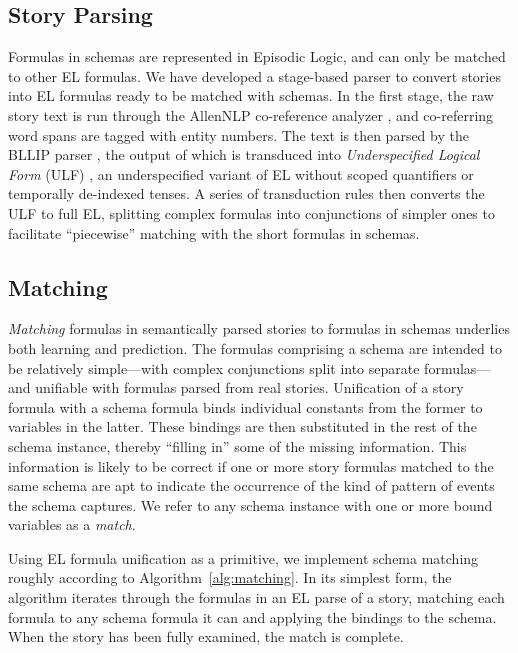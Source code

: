 \subsection{Story Parsing}
\label{sec:parsing}
Formulas in schemas are represented in Episodic Logic, and can only be matched to other EL formulas. We have developed a stage-based parser to convert stories into EL formulas ready to be matched with schemas. In the first stage, the raw story text is run through the AllenNLP co-reference analyzer \citep{Gardner2017AllenNLP}, and co-referring word spans are tagged with entity numbers. The text is then parsed by the BLLIP parser \citep{charniak2000maximum}, the output of which is transduced into \textit{Underspecified Logical Form} (ULF) \citep{kim2019IWCS}, an underspecified variant of EL without scoped quantifiers or temporally de-indexed tenses. A series of transduction rules then converts the ULF to full EL, splitting complex formulas into conjunctions of simpler ones to facilitate ``piecewise'' matching with the short formulas in schemas.

\subsection{Matching}

\textit{Matching} formulas in semantically parsed stories to formulas in schemas underlies both learning and prediction. The formulas comprising a schema are intended to be relatively simple---with complex conjunctions split into separate formulas---and unifiable with formulas parsed from real stories. Unification of a story formula with a schema formula binds individual constants from the former to variables in the latter. These bindings are then substituted in the rest of the schema instance, thereby ``filling in'' some of the missing information. %
This information is likely to be correct if one or more story formulas matched to the same schema are apt to indicate the occurrence of the kind of pattern of events the schema captures. 
We refer to any schema instance with one or more bound variables as a \textit{match}.

Using EL formula unification as a primitive, we implement schema matching roughly according to Algorithm~\ref{alg:matching}. In its simplest form, the algorithm iterates through the formulas in an EL parse of a story, matching each formula to any schema formula it can and applying the bindings to the schema. When the story has been fully examined, the match is complete.

